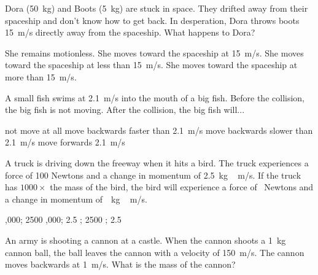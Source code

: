 \documentclass[answers,dvipsnames]{exam}
\begin{document}
\begin{questions}
\question
Dora (\SI{50}{kg}) and Boots (\SI{5}{kg}) are stuck in space.  They drifted away from their spaceship and don’t know how to get back.  In desperation, Dora throws boots \SI{15}{m/s} directly away from the spaceship. What happens to Dora?

\begin{randomizechoices}[norandomize]
    \choice She remains motionless.
    \choice She moves toward the spaceship at \SI{15}{m/s}.
    \correctchoice She moves toward the spaceship at less than \SI{15}{m/s}.
    \choice She moves toward the spaceship at more than \SI{15}{m/s}.
\end{randomizechoices}

\question
A small fish swims at \SI{2.1}{m/s} into the mouth of a big fish.  Before the collision, the big fish is not moving.  After the collision, the big fish will...
\vspace{-1em}

\begin{center}
\end{center}

\begin{randomizechoices}[norandomize]
    \choice not move at all
    \choice move backwards faster than \SI{2.1}{m/s}
    \correctchoice move backwards slower than \SI{2.1}{m/s}
    \choice move forwards \SI{2.1}{m/s}
\end{randomizechoices}


\question
A truck is driving down the freeway when it hits a bird. The truck experiences a force of 100 Newtons and a change in momentum of \SI{2.5}{kg\,m/s}. If the truck has $1000\times$ the mass of the bird, the bird will experience a force of \fillin\ Newtons and a change in momentum of \fillin\,\SI{}{kg\,m/s}.

\begin{randomizechoices}[norandomize]
    ,000; 2500
    ,000; 2.5
    ; 2500
    ; 2.5
\end{randomizechoices}

\question
An army is shooting a cannon at a castle. When the cannon shoots a \SI{1}{kg} cannon ball, the ball leaves the cannon with a velocity of \SI{150}{m/s}. The cannon moves backwards at \SI{1}{m/s}. What is the mass of the cannon?


\end{questions}
\end{document}
